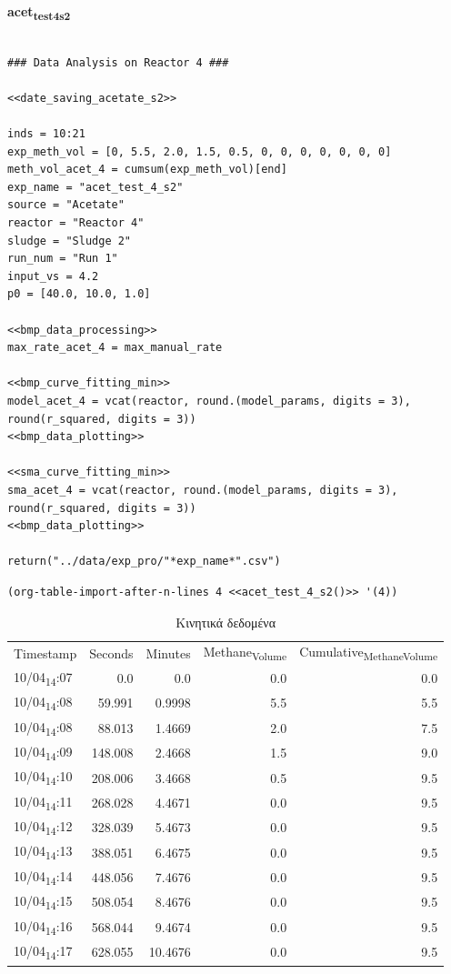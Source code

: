 \documentclass[11pt]{article}
\begin{document}
\textbf{acet\textsubscript{test}\textsubscript{4}\textsubscript{s2}}
\begin{verbatim}

### Data Analysis on Reactor 4 ###

<<date_saving_acetate_s2>>

inds = 10:21
exp_meth_vol = [0, 5.5, 2.0, 1.5, 0.5, 0, 0, 0, 0, 0, 0, 0]
meth_vol_acet_4 = cumsum(exp_meth_vol)[end]
exp_name = "acet_test_4_s2"
source = "Acetate"
reactor = "Reactor 4"
sludge = "Sludge 2"
run_num = "Run 1"
input_vs = 4.2
p0 = [40.0, 10.0, 1.0]

<<bmp_data_processing>>
max_rate_acet_4 = max_manual_rate

<<bmp_curve_fitting_min>>
model_acet_4 = vcat(reactor, round.(model_params, digits = 3), round(r_squared, digits = 3))
<<bmp_data_plotting>>

<<sma_curve_fitting_min>>
sma_acet_4 = vcat(reactor, round.(model_params, digits = 3), round(r_squared, digits = 3))  
<<bmp_data_plotting>>

return("../data/exp_pro/"*exp_name*".csv")
\end{verbatim}

\begin{verbatim}
(org-table-import-after-n-lines 4 <<acet_test_4_s2()>> '(4))
\end{verbatim}

\begin{table}[htbp]
\caption{Κινητικά δεδομένα}
\centering
\begin{tabular}{lrrrr}
Timestamp & Seconds & Minutes & Methane\textsubscript{Volume} & Cumulative\textsubscript{Methane}\textsubscript{Volume}\\[0pt]
10/04\textsubscript{14}:07 & 0.0 & 0.0 & 0.0 & 0.0\\[0pt]
10/04\textsubscript{14}:08 & 59.991 & 0.9998 & 5.5 & 5.5\\[0pt]
10/04\textsubscript{14}:08 & 88.013 & 1.4669 & 2.0 & 7.5\\[0pt]
10/04\textsubscript{14}:09 & 148.008 & 2.4668 & 1.5 & 9.0\\[0pt]
10/04\textsubscript{14}:10 & 208.006 & 3.4668 & 0.5 & 9.5\\[0pt]
10/04\textsubscript{14}:11 & 268.028 & 4.4671 & 0.0 & 9.5\\[0pt]
10/04\textsubscript{14}:12 & 328.039 & 5.4673 & 0.0 & 9.5\\[0pt]
10/04\textsubscript{14}:13 & 388.051 & 6.4675 & 0.0 & 9.5\\[0pt]
10/04\textsubscript{14}:14 & 448.056 & 7.4676 & 0.0 & 9.5\\[0pt]
10/04\textsubscript{14}:15 & 508.054 & 8.4676 & 0.0 & 9.5\\[0pt]
10/04\textsubscript{14}:16 & 568.044 & 9.4674 & 0.0 & 9.5\\[0pt]
10/04\textsubscript{14}:17 & 628.055 & 10.4676 & 0.0 & 9.5\\[0pt]
\end{tabular}
\end{table}
\end{document}
